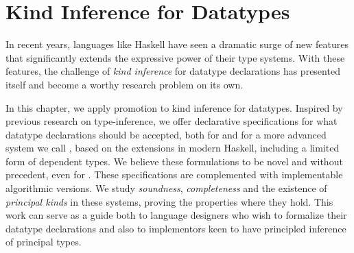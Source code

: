 \chapter{Kind Inference for Datatypes}
\label{chap:kindinference}

In recent years, languages like Haskell have seen a dramatic surge of new
features that significantly extends the expressive power of their type systems.
With these features, the challenge of \emph{kind inference} for datatype
declarations has presented itself and become a worthy research problem on its
own.

In this chapter, we apply promotion to kind inference for datatypes. Inspired by
previous research on type-inference, we offer declarative specifications for
what datatype declarations should be accepted, both for \hne and for a more
advanced system we call \tit, based on the extensions in modern Haskell,
including a limited form of dependent types. We believe these formulations to be
novel and without precedent, even for \hne. These specifications are
complemented with implementable algorithmic versions. We study \emph{soundness},
\emph{completeness} and the existence of \emph{principal kinds} in these
systems, proving the properties where they hold. This work can serve as a guide
both to language designers who wish to formalize their datatype declarations and
also to implementors keen to have principled inference of principal types.









